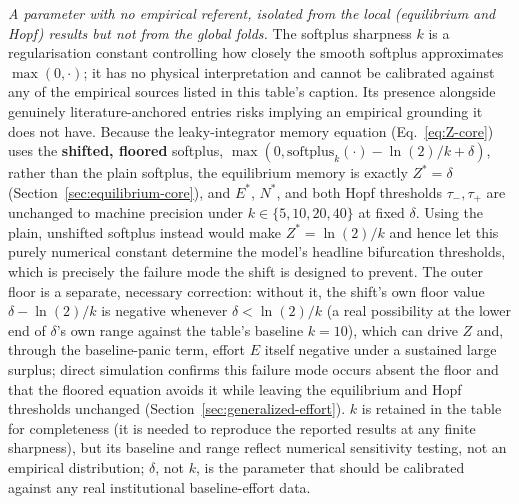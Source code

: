 \documentclass[twocolumn,10pt]{article}
\begin{document}
\emph{A parameter with no empirical referent, isolated from the local (equilibrium and Hopf) results but not from the global folds.} The softplus sharpness $k$ is a regularisation constant controlling how closely the smooth softplus approximates $\max(0,\cdot)$; it has no physical interpretation and cannot be calibrated against any of the empirical sources listed in this table's caption. Its presence alongside genuinely literature-anchored entries risks implying an empirical grounding it does not have. Because the leaky-integrator memory equation (Eq.~\eqref{eq:Z-core}) uses the \textbf{shifted, floored} softplus, $\max(0,\text{softplus}_k(\cdot)-\ln(2)/k+\delta)$, rather than the plain softplus, the equilibrium memory is exactly $Z^*=\delta$ (Section~\ref{sec:equilibrium-core}), and $E^*$, $N^*$, and both Hopf thresholds $\tau_-,\tau_+$ are unchanged to machine precision under $k\in\{5,10,20,40\}$ at fixed $\delta$. Using the plain, unshifted softplus instead would make $Z^*=\ln(2)/k$ and hence let this purely numerical constant determine the model's headline bifurcation thresholds, which is precisely the failure mode the shift is designed to prevent. The outer floor is a separate, necessary correction: without it, the shift's own floor value $\delta-\ln(2)/k$ is negative whenever $\delta<\ln(2)/k$ (a real possibility at the lower end of $\delta$'s own range against the table's baseline $k=10$), which can drive $Z$ and, through the baseline-panic term, effort $E$ itself negative under a sustained large surplus; direct simulation confirms this failure mode occurs absent the floor and that the floored equation avoids it while leaving the equilibrium and Hopf thresholds unchanged (Section~\ref{sec:generalized-effort}). $k$ is retained in the table for completeness (it is needed to reproduce the reported results at any finite sharpness), but its baseline and range reflect numerical sensitivity testing, not an empirical distribution; $\delta$, not $k$, is the parameter that should be calibrated against any real institutional baseline-effort data.
\end{document}
